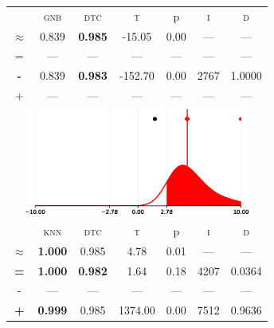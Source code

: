 \begin{tabular}{c||cc||c|c|c||c}
\midrule	&\textsc{gnb} & \textsc{dtc} & \textsc{t} & p & \textsc{i} & \textsc{d}\\
	\color{blue} $\approx$ & \color{blue}  0.839 &\color{blue}  \bfseries 0.985 & -15.05 & 0.00 & --- & ---\\\midrule
	{\tiny=}& --- & --- & --- & --- & --- & ---\\
	{\bfseries\color{blue}\tiny-}& \color{blue}  0.839 & \color{blue} \bfseries 0.983 & -152.70 & 0.00 & 2767 & \color{blue} 1.0000\\
	{\tiny+}& --- & --- & --- & --- & --- & ---\\
	\bottomrule
	\multicolumn{7}{c}{\includegraphics[width=7.5cm, trim=30 0 30 0]{figures/banknote_2.eps}}\\

\midrule	&\textsc{knn} & \textsc{dtc} & \textsc{t} & p & \textsc{i} & \textsc{d}\\
	\color{red} $\approx$ & \color{red} \bfseries 1.000 &\color{red}   0.985 & 4.78 & 0.01 & --- & ---\\\midrule
	{\bfseries\color{black}\tiny=}& \color{black} \bfseries 1.000 & \color{black} \bfseries 0.982 & 1.64 & 0.18 & 4207 & \color{black} 0.0364\\
	{\tiny-}& --- & --- & --- & --- & --- & ---\\
	{\bfseries\color{red}\tiny+}& \color{red} \bfseries 0.999 & \color{red}  0.985 & 1374.00 & 0.00 & 7512 & \color{red} 0.9636\\
\bottomrule\end{tabular}


